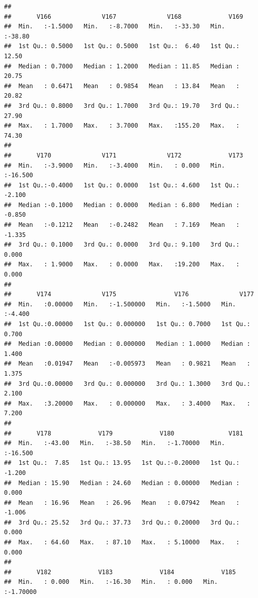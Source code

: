 \documentclass[
]{article}
\begin{document}
\begin{verbatim}
##                                                                   
##       V166              V167              V168             V169       
##  Min.   :-1.5000   Min.   :-8.7000   Min.   :-33.30   Min.   :-38.80  
##  1st Qu.: 0.5000   1st Qu.: 0.5000   1st Qu.:  6.40   1st Qu.: 12.50  
##  Median : 0.7000   Median : 1.2000   Median : 11.85   Median : 20.75  
##  Mean   : 0.6471   Mean   : 0.9854   Mean   : 13.84   Mean   : 20.82  
##  3rd Qu.: 0.8000   3rd Qu.: 1.7000   3rd Qu.: 19.70   3rd Qu.: 27.90  
##  Max.   : 1.7000   Max.   : 3.7000   Max.   :155.20   Max.   : 74.30  
##                                                                       
##       V170              V171              V172             V173        
##  Min.   :-3.9000   Min.   :-3.4000   Min.   : 0.000   Min.   :-16.500  
##  1st Qu.:-0.4000   1st Qu.: 0.0000   1st Qu.: 4.600   1st Qu.: -2.100  
##  Median :-0.1000   Median : 0.0000   Median : 6.800   Median : -0.850  
##  Mean   :-0.1212   Mean   :-0.2482   Mean   : 7.169   Mean   : -1.335  
##  3rd Qu.: 0.1000   3rd Qu.: 0.0000   3rd Qu.: 9.100   3rd Qu.:  0.000  
##  Max.   : 1.9000   Max.   : 0.0000   Max.   :19.200   Max.   :  0.000  
##                                                                        
##       V174              V175                V176              V177       
##  Min.   :0.00000   Min.   :-1.500000   Min.   :-1.5000   Min.   :-4.400  
##  1st Qu.:0.00000   1st Qu.: 0.000000   1st Qu.: 0.7000   1st Qu.: 0.700  
##  Median :0.00000   Median : 0.000000   Median : 1.0000   Median : 1.400  
##  Mean   :0.01947   Mean   :-0.005973   Mean   : 0.9821   Mean   : 1.375  
##  3rd Qu.:0.00000   3rd Qu.: 0.000000   3rd Qu.: 1.3000   3rd Qu.: 2.100  
##  Max.   :3.20000   Max.   : 0.000000   Max.   : 3.4000   Max.   : 7.200  
##                                                                          
##       V178             V179             V180               V181        
##  Min.   :-43.00   Min.   :-38.50   Min.   :-1.70000   Min.   :-16.500  
##  1st Qu.:  7.85   1st Qu.: 13.95   1st Qu.:-0.20000   1st Qu.: -1.200  
##  Median : 15.90   Median : 24.60   Median : 0.00000   Median :  0.000  
##  Mean   : 16.96   Mean   : 26.96   Mean   : 0.07942   Mean   : -1.006  
##  3rd Qu.: 25.52   3rd Qu.: 37.73   3rd Qu.: 0.20000   3rd Qu.:  0.000  
##  Max.   : 64.60   Max.   : 87.10   Max.   : 5.10000   Max.   :  0.000  
##                                                                        
##       V182             V183             V184             V185         
##  Min.   : 0.000   Min.   :-16.30   Min.   : 0.000   Min.   :-1.70000  

\end{verbatim}
\end{document}
